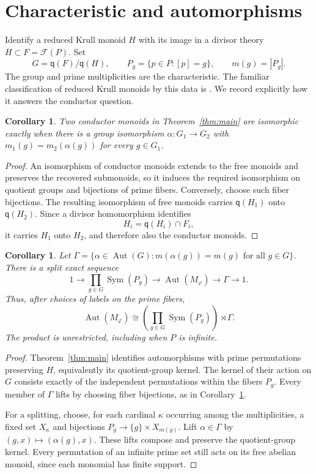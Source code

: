 \documentclass[11pt]{article}
\newtheorem{corollary}[theorem]{Corollary}
\theoremstyle{definition}
\newcommand{\q}{\mathsf q}
\newcommand{\Aut}{\operatorname{Aut}}
\newcommand{\Sym}{\operatorname{Sym}}
\begin{document}
\section{Characteristic and automorphisms}

Identify a reduced Krull monoid $H$ with its image in a divisor theory $H\subset F=\mathcal F(P)$. Set
\[
 G=\q(F)/\q(H),\qquad P_g=\{p\in P:[p]=g\},\qquad m(g)=|P_g|.
\]
The group and prime multiplicities are the characteristic. The familiar classification of reduced Krull monoids by this data is \cite[Theorem 2.5.4]{GHK}. We record explicitly how it answers the conductor question.

\begin{corollary}\label{cor:characteristic}
Two conductor monoids in Theorem~\ref{thm:main} are isomorphic exactly when there is a group isomorphism $\alpha:G_1\to G_2$ with $m_1(g)=m_2(\alpha(g))$ for every $g\in G_1$.
\end{corollary}
\begin{proof}
An isomorphism of conductor monoids extends to the free monoids and preserves the recovered submonoids, so it induces the required isomorphism on quotient groups and bijections of prime fibers. Conversely, choose such fiber bijections. The resulting isomorphism of free monoids carries $\q(H_1)$ onto $\q(H_2)$. Since a divisor homomorphism identifies
\begin{equation}\label{eq:saturation}
 H_i=\q(H_i)\cap F_i,
\end{equation}
it carries $H_1$ onto $H_2$, and therefore also the conductor monoids.
\end{proof}

\begin{corollary}\label{cor:automorphisms}
Let $\Gamma=\{\alpha\in\Aut(G):m(\alpha(g))=m(g)\text{ for all }g\in G\}$. There is a split exact sequence
\[
 1\longrightarrow\prod_{g\in G}\Sym(P_g)
 \longrightarrow\Aut(M_\varphi)\longrightarrow\Gamma\longrightarrow1.
\]
Thus, after choices of labels on the prime fibers,
\[
 \Aut(M_\varphi)\cong
 \left(\prod_{g\in G}\Sym(P_g)\right)\rtimes\Gamma.
\]
The product is unrestricted, including when $P$ is infinite.
\end{corollary}
\begin{proof}
Theorem~\ref{thm:main} identifies automorphisms with prime permutations preserving $H$, equivalently its quotient-group kernel. The kernel of their action on $G$ consists exactly of the independent permutations within the fibers $P_g$. Every member of $\Gamma$ lifts by choosing fiber bijections, as in Corollary~\ref{cor:characteristic}.

For a splitting, choose, for each cardinal $\kappa$ occurring among the multiplicities, a fixed set $X_\kappa$ and bijections $P_g\to\{g\}\times X_{m(g)}$. Lift $\alpha\in\Gamma$ by $(g,x)\mapsto(\alpha(g),x)$. These lifts compose and preserve the quotient-group kernel. Every permutation of an infinite prime set still acts on its free abelian monoid, since each monomial has finite support.
\end{proof}
\end{document}
